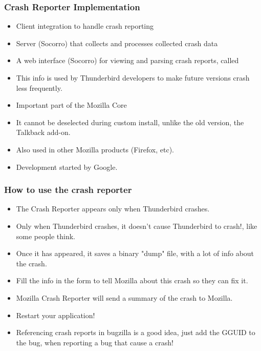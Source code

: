 \documentclass{beamer}
\begin{document}

\begin{frame}
 \frametitle{Crash Reporter Implementation}
 \begin{itemize}
   \item Client integration to handle crash reporting 
   \item Server (Socorro) that collects and processes collected crash data
   \item A web interface (Socorro) for viewing and parsing crash reports, called
   \item This info is used by Thunderbird developers to make future versions crash less frequently. 
   \item Important part of the Mozilla Core
   \item It cannot be deselected during custom install, unlike the old version, the Talkback add-on.
   \item Also used in other Mozilla products (Firefox, etc).
   \item Development started by Google.
 \end{itemize}
\end{frame}


\begin{frame}
 \frametitle{How to use the crash reporter}
 \begin{itemize}
  \item The Crash Reporter appears only when Thunderbird crashes.
  \item Only when Thunderbird crashes, it doesn't cause Thunderbird to crash!, like some people think.
  \item Once it has appeared, it saves a binary "dump" file, with a lot of info about the crash.
  \item Fill the info in the form to tell Mozilla about this crash so they can fix it.
  \item Mozilla Crash Reporter will send a summary of the crash to Mozilla.
  \item Restart your application!
  \item Referencing crash reports in bugzilla is a good idea, just add the GGUID to the bug, when reporting a bug that cause a crash!
 \end{itemize}
\end{frame}

\end{document}
